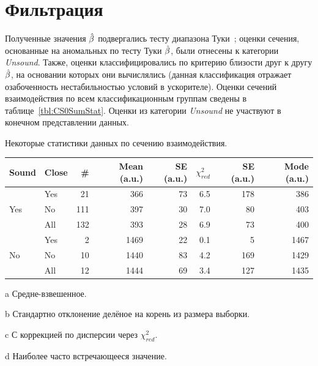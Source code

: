 \documentclass{article}
\begin{document}
	\section{Фильтрация}
	Полученные значения $\slp*$ подвергались тесту диапазона Туки~\cite{Tukey_range_test}; оценки сечения, основанные на аномальных по тесту Туки $\slp*$, были отнесены к категории \emph{Unsound}. Также, оценки классифицировались по критерию близости друг к другу $\slp*$, на основании которых они вычислялись (данная классификация отражает озабоченность нестабильностью условий в ускорителе). Оценки сечений взаимодействия по всем классификационным группам сведены в таблице~\ref{tbl:CS0SumStat}. Оценки из категории \emph{Unsound} не участвуют в конечном представлении данных.
	
	\begin{center}
		\begin{threeparttable}[H]
			\centering
			\caption{Некоторые статистики данных по сечению взаимодействия.\label{tbl:CS0SumStat}}
			\begin{tabular}{llrrrrrr}
				\hline\hline
				Sound                & Close &  \# & Mean\tnote{a} (a.u.) & SE\tnote{b} (a.u.) & $\chi^2_{red}$ & SE\tnote{c} (a.u.) &  Mode\tnote{d} (a.u.)\\ \hline
				\multirow{3}{*}{Yes} & Yes   &  21 &                  366 &                 73 &            6.5 &                178 &  386 \\
				& No    & 111 &                  397 &                 30 &            7.0 &                 80 &  403 \\
				& All   & 132 &                  393 &                 28 &            6.9 &                 73 &  400 \\ \hline
				\multirow{3}{*}{No}  & Yes   &   2 &                 1469 &                 22 &            0.1 &                  5 & 1467 \\
				& No    &  10 &                 1440 &                 83 &            4.2 &                169 & 1429 \\
				& All   &  12 &                 1444 &                 69 &            3.4 &                127 & 1435 \\ \hline
			\end{tabular}
			\begin{tablenotes}
				\item[a]{Средне-взвешенное.}
				\item[b]{Стандартно отклонение делёное на корень из размера выборки.}
				\item[c]{С коррекцией по дисперсии через $\chi^2_{red}$.}
				\item[d]{Наиболее часто встречающееся значение.}
			\end{tablenotes}
		\end{threeparttable}
	\end{center}
	
\end{document}
